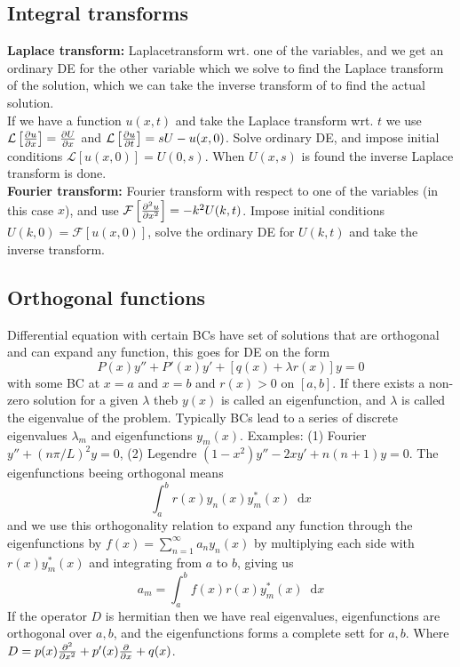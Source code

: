 \documentclass[a4paper, 10pt]{article}
\newcommand*\diff{\mathop{}\!\mathrm{d}}
\begin{document}
\begin{multicols*}{3}
\subsection*{Integral transforms}
\textbf{Laplace transform:}
Laplacetransform wrt. one of the variables, and we get an ordinary DE for the other variable which we solve to find the Laplace transform of the solution, which we can take the inverse transform of to find the actual solution.\\
If we have a function $u(x, t)$ and take the Laplace transform wrt. $t$ we use $\mathcal{L}\left[\pdv{u}{x}\right]=\pdv{U}{x}$ and $\mathcal{L}\left[\pdv{u}{t}\right] = sU - u(x,0)$. Solve ordinary DE, and impose initial conditions $\mathcal{L}\left[u(x,0)\right] = U(0, s)$. When $U(x,s)$ is found the inverse Laplace transform is done.\\
\textbf{Fourier transform:}
Fourier transform with respect to one of the variables (in this case $x$), and use $\mathcal{F}\left[\pdv[2]{u}{x}\right] = -k^2U(k,t)$. Impose initial conditions $U(k,0)=\mathcal{F}\left[u(x,0)\right]$, solve the ordinary DE for $U(k,t)$ and take the inverse transform.

\subsection*{Orthogonal functions}
Differential equation with certain BCs have set of solutions that are orthogonal and can expand any function, this goes for DE on the form
$$ P(x)y'' + P'(x)y' + \left[q(x) + \lambda r(x)\right]y = 0 $$
with some BC at $x=a$ and $x=b$ and $r(x)>0$ on $[a,b]$. If there exists a non-zero solution for a given $\lambda$ theb $y(x)$ is called an eigenfunction, and $\lambda$ is called the eigenvalue of the problem. Typically BCs lead to a series of discrete eigenvalues $\lambda_m$ and eigenfunctions $y_m(x)$. Examples: (1) Fourier $y'' + (n\pi/L)^2y=0$, (2) Legendre $(1-x^2)y'' - 2xy'+n(n+1)y = 0$. The eigenfunctions beeing orthogonal means
$$ \int_a^br(x)y_n(x)y_m^*(x)\diff x $$
and we use this orthogonality relation to expand any function through the eigenfunctions by $f(x) = \sum_{n=1}^\infty a_n y_n(x)$ by multiplying each side with $r(x)y_m^*(x)$ and integrating from $a$ to $b$, giving us
$$ a_m = \int_a^b f(x)r(x)y_m^*(x) \diff x$$
If the operator $D$ is hermitian then we have real eigenvalues, eigenfunctions are orthogonal over $a,b$, and the eigenfunctions forms a complete sett for $a,b$. Where $D= p(x)\pdv[2]{}{x}+p'(x)\pdv{}{x} +q(x)$.








\end{multicols*}
\end{document}
